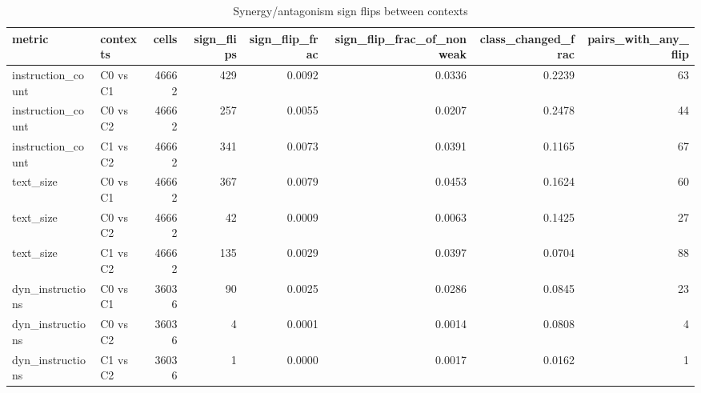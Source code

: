 \begin{table}[t]
\centering
\caption{Synergy/antagonism sign flips between contexts}
\label{tab:rq1-sign-flips}
\begin{tabular}{llrrrrrr}
\toprule
metric & contexts & cells & sign\_flips & sign\_flip\_frac & sign\_flip\_frac\_of\_nonweak & class\_changed\_frac & pairs\_with\_any\_flip \\
\midrule
instruction\_count & C0 vs C1 & 46662 & 429 & 0.0092 & 0.0336 & 0.2239 & 63 \\
instruction\_count & C0 vs C2 & 46662 & 257 & 0.0055 & 0.0207 & 0.2478 & 44 \\
instruction\_count & C1 vs C2 & 46662 & 341 & 0.0073 & 0.0391 & 0.1165 & 67 \\
text\_size & C0 vs C1 & 46662 & 367 & 0.0079 & 0.0453 & 0.1624 & 60 \\
text\_size & C0 vs C2 & 46662 & 42 & 0.0009 & 0.0063 & 0.1425 & 27 \\
text\_size & C1 vs C2 & 46662 & 135 & 0.0029 & 0.0397 & 0.0704 & 88 \\
dyn\_instructions & C0 vs C1 & 36036 & 90 & 0.0025 & 0.0286 & 0.0845 & 23 \\
dyn\_instructions & C0 vs C2 & 36036 & 4 & 0.0001 & 0.0014 & 0.0808 & 4 \\
dyn\_instructions & C1 vs C2 & 36036 & 1 & 0.0000 & 0.0017 & 0.0162 & 1 \\
\bottomrule
\end{tabular}
\end{table}
